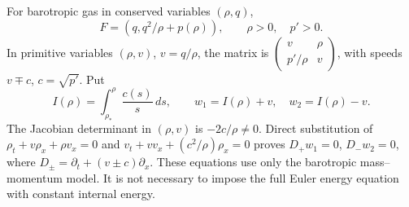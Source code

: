For barotropic gas in conserved variables $(\rho,q)$,
\[
 F=(q,q^2/\rho+p(\rho)),\qquad \rho>0,\quad p'>0.
\]
In primitive variables $(\rho,v)$, $v=q/\rho$, the matrix is
$\left(\begin{smallmatrix}v&\rho\\p'/\rho&v\end{smallmatrix}\right)$,
with speeds $v\mp c$, $c=\sqrt{p'}$. Put
\begin{equation}\label{eq:11-gas-invariants}
 I(\rho)=\int_{\rho_*}^{\rho}\frac{c(s)}s\,ds,\qquad
 w_1=I(\rho)+v,\quad w_2=I(\rho)-v.
\end{equation}
The Jacobian determinant in $(\rho,v)$ is $-2c/\rho\ne0$.
Direct substitution of
$\rho_t+v\rho_x+\rho v_x=0$ and
$v_t+vv_x+(c^2/\rho)\rho_x=0$ proves
$D_+w_1=0$, $D_-w_2=0$, where $D_\pm=\partial_t+(v\pm c)\partial_x$.
These equations use only the barotropic mass--momentum model.
It is not necessary to impose the full Euler energy equation with
constant internal energy.

